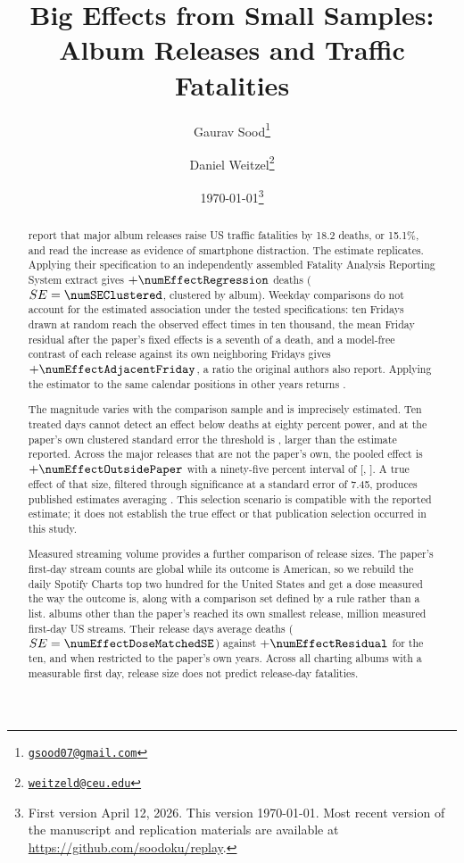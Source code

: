 \documentclass[11pt]{article}
\title{Big Effects from Small Samples:\\
Album Releases and Traffic Fatalities}
\author{
Gaurav Sood\thanks{\href{mailto:gsood07@gmail.com}{\texttt{gsood07@gmail.com}}}
\and
Daniel Weitzel\thanks{\href{mailto:weitzeld@ceu.edu}{\texttt{weitzeld@ceu.edu}}}
}
\date{\today\thanks{First version April 12, 2026. This version \today. Most recent version of the manuscript and replication materials are available at \href{https://github.com/soodoku/replay}{https://github.com/soodoku/replay}.}}
\begin{document}
\maketitle

\vspace{0.5cm}

\begin{abstract}
\begin{singlespace}
\citet{patel2026smartphones} report that major album releases raise US traffic fatalities by
18.2 deaths, or 15.1\%, and read the increase as evidence of smartphone distraction. The estimate
replicates. Applying their specification to an independently assembled
Fatality Analysis Reporting System extract gives $+\numEffectRegression$ deaths
($SE = \numSEClustered$, clustered by album). Weekday comparisons do not account for the estimated association under the tested specifications: ten Fridays
drawn at random reach the observed effect \numFridayPlaceboDraws{} times in ten thousand, the mean
Friday residual after the paper's fixed effects is a seventh of a death, and a model-free contrast
of each release against its own neighboring Fridays gives $+\numEffectAdjacentFriday$, a ratio
the original authors also report. Applying the estimator to the same calendar positions in other
years returns \numEffectCalendarPlacebo{}.

The magnitude varies with the comparison sample and is imprecisely estimated. Ten treated days cannot detect an effect below
\numMDEEighty{} deaths at eighty percent power, and at the paper's own clustered standard error the
threshold is \numMDEEightyClustered{}, larger than the estimate reported. Across the
\numNOutsidePaper{} major releases that are not the paper's own, the pooled effect is
$+\numEffectOutsidePaper$ with a ninety-five percent interval of
[\numCIOutsideLo, \numCIOutsideHi]. A true effect of that size, filtered through significance at a
standard error of 7.45, produces published estimates averaging \numMeanPublishedAtOutside{}. This selection scenario is compatible with the reported estimate; it does not establish the
true effect or that publication selection occurred in this study.

Measured streaming volume provides a further comparison of release sizes. The paper's first-day stream
counts are global while its outcome is American, so we rebuild the daily Spotify Charts top two
hundred for the United States and get a dose measured the way the outcome is, along with a
comparison set defined by a rule rather than a list. \numNDoseMatched{} albums other than the
paper's reached its own smallest release, \numDoseCut{} million measured first-day US streams.
Their release days average \numEffectDoseMatched{} deaths
($SE = \numEffectDoseMatchedSE$) against $+\numEffectResidual$ for the ten, and
\numEffectDoseMatchedWindow{} when restricted to the paper's own years. Across all
\numNDoseAll{} charting albums with a measurable first day, release size does not predict
release-day fatalities.


\end{singlespace}
\end{abstract}
\end{document}
